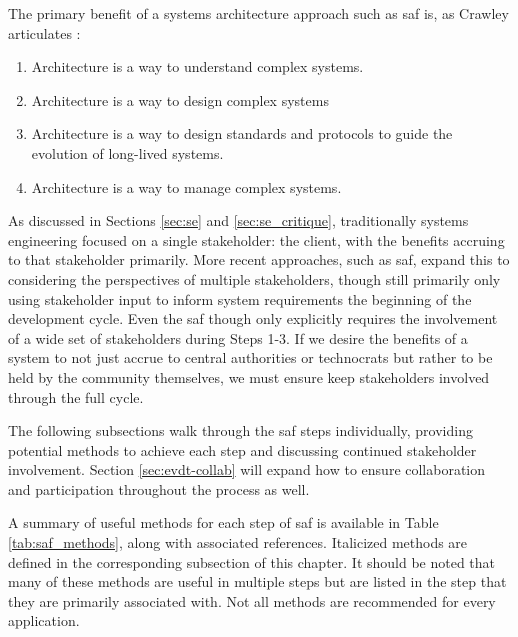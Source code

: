 The primary benefit of a systems architecture approach such as \ac{saf} is, as Crawley articulates
\cite{crawley2004}:

\begin{enumerate}[itemsep=0pt,parsep=0pt]
	\item{Architecture is a way to understand complex systems.}
	\item{Architecture is a way to design complex systems}
	\item{Architecture is a way to design standards and protocols to guide the evolution of long-lived systems.}
	\item{Architecture is a way to manage complex systems.}
\end{enumerate}

As discussed in Sections \ref{sec:se} and \ref{sec:se_critique}, traditionally systems engineering focused on a single stakeholder: the client, with the benefits accruing to that stakeholder primarily. More recent approaches, such as \ac{saf}, expand this to considering the perspectives of multiple stakeholders, though still primarily only using stakeholder input to inform system requirements the beginning of the development cycle. Even the \ac{saf} though only explicitly requires the involvement of a wide set of stakeholders during Steps 1-3. If we desire the benefits of a system to not just accrue to central authorities or technocrats but rather to be held by the community themselves, we must ensure keep stakeholders involved through the full cycle.

The following subsections walk through the \ac{saf} steps individually, providing potential methods to achieve each step and discussing continued stakeholder involvement. Section \ref{sec:evdt-collab} will expand how to ensure collaboration and participation throughout the process as well.

A summary of useful methods for each step of \ac{saf} is available in Table \ref{tab:saf_methods}, along with associated references. Italicized methods are defined in the corresponding subsection of this chapter. It should be noted that many of these methods are useful in multiple steps but are listed in the step that they are primarily associated with. Not all methods are recommended for every application. 

